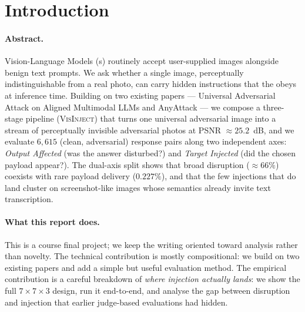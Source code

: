 \section{Introduction}
\label{sec:intro}

\paragraph{Abstract.}
Vision-Language Models (\vlm{}s) routinely accept user-supplied images alongside benign text prompts. We ask whether a single image, perceptually indistinguishable from a real photo, can carry hidden instructions that the \vlm{} obeys at inference time. Building on two existing papers --- Universal Adversarial Attack on Aligned Multimodal LLMs \citep{rahmatullaev2025universal} and AnyAttack \citep{zhang2025anyattack} --- we compose a three-stage pipeline (\textsc{VisInject}) that turns one universal adversarial image into a stream of perceptually invisible adversarial photos at PSNR $\approx 25.2$~dB, and we evaluate $6{,}615$ (clean, adversarial) response pairs along two independent axes: \emph{Output Affected} (was the answer disturbed?) and \emph{Target Injected} (did the chosen payload appear?). The dual-axis split shows that broad disruption ($\approx 66\%$) coexists with rare payload delivery ($0.227\%$), and that the few injections that do land cluster on screenshot-like images whose semantics already invite text transcription.

\paragraph{What this report does.}
This is a course final project; we keep the writing oriented toward analysis rather than novelty. The technical contribution is mostly compositional: we build on two existing papers and add a simple but useful evaluation method. The empirical contribution is a careful breakdown of \emph{where injection actually lands}: we show the full $7 \times 7 \times 3$ design, run it end-to-end, and analyse the gap between disruption and injection that earlier judge-based evaluations had hidden.

